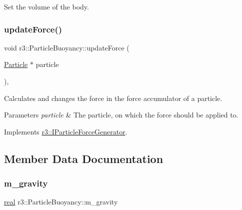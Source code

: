 Set the volume of the body. 

\mbox{\label{classr3_1_1_particle_buoyancy_afb3fc83d65052567b972e139ce167995}} 
\subsubsection{\texorpdfstring{update\+Force()}{updateForce()}}
{\footnotesize\ttfamily void r3\+::\+Particle\+Buoyancy\+::update\+Force (\begin{DoxyParamCaption}\item[{\mbox{\hyperlink{classr3_1_1_particle}{Particle}} $\ast$}]{particle }\end{DoxyParamCaption})\hspace{0.3cm}{\ttfamily [override]}, {\ttfamily [virtual]}}



Calculates and changes the force in the force accumulator of a particle. 


\begin{DoxyParams}{Parameters}
{\em particle} & The particle, on which the force should be applied to. \\
\hline
\end{DoxyParams}


Implements \mbox{\hyperlink{classr3_1_1_i_particle_force_generator_af705063c5d7debca0f7a5c5c68c28f50}{r3\+::\+I\+Particle\+Force\+Generator}}.



\subsection{Member Data Documentation}
\mbox{\label{classr3_1_1_particle_buoyancy_a619b460c0ac8b80c4470f2784f81cc8d}} 
\subsubsection{\texorpdfstring{m\+\_\+gravity}{m\_gravity}}
{\footnotesize\ttfamily \mbox{\hyperlink{namespacer3_ab2016b3e3f743fb735afce242f0dc1eb}{real}} r3\+::\+Particle\+Buoyancy\+::m\+\_\+gravity\hspace{0.3cm}{\ttfamily [protected]}}

